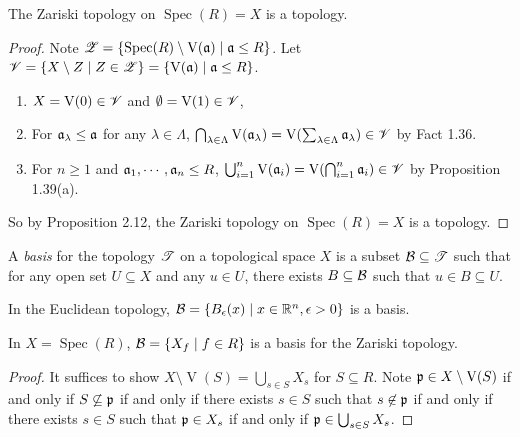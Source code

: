\begin{theorem}
    The Zariski topology on $\operatorname{Spec}(R) = X$ is a topology.
\end{theorem}

\begin{proof}
    Note $\mathscr{Z} = \{\operatorname{Spec}(R) \setminus \operatorname{V}(\mathfrak{a}) \mid \mathfrak{a} \leq R\}$. Let $\mathscr{V} = \{X \setminus Z \mid Z \in \mathscr{Z}\} = \{\operatorname{V}(\mathfrak{a}) \mid \mathfrak{a} \leq R\}$. 
    \begin{enumerate}
        \item $X = \operatorname{V}(0) \in \mathscr{V}$ and $\emptyset = \operatorname{V}(1) \in \mathscr{V}$,
        \item For $\mathfrak{a}_\lambda \leq \mathfrak{a}$ for any $\lambda \in \Lambda$, $\bigcap_{\lambda \in \Lambda} \operatorname{V}(\mathfrak{a}_\lambda) = \operatorname{V}(\sum_{\lambda \in \Lambda} \mathfrak{a}_\lambda) \in \mathscr{V}$ by Fact 1.36.
        \item For $n \geq 1$ and $\mathfrak{a}_1,\cdots,\mathfrak{a}_n \leq R$, $\bigcup_{i=1}^n \operatorname{V}(\mathfrak{a}_i) = \operatorname{V}(\bigcap_{i=1}^n \mathfrak{a}_i) \in \mathscr{V}$ by Proposition 1.39(a). \qedhere
    \end{enumerate}
    So by Proposition 2.12, the Zariski topology on $\operatorname{Spec}(R) = X$ is a topology.
\end{proof}

\begin{definition}
    A \emph{basis} for the topology $\mathscr{T}$ on a topological space $X$ is a subset $\mathcal{B} \subseteq \mathscr{T}$ such that for any open set $U \subseteq X$ and any $u \in U$, there exists $B \subseteq \mathcal{B}$ such that $u \in B \subseteq U$.
\end{definition}

\begin{example}
    In the Euclidean topology, $\mathcal{B} = \{B_\epsilon(x) \mid x \in \mathbb{R}^n, \epsilon > 0\}$ is a basis.
\end{example}

\begin{theorem}
    In $X = \operatorname{Spec}(R)$, $\mathcal{B} = \{X_f \mid f \in R\}$ is a basis for the Zariski topology.
\end{theorem}

\begin{proof}
    It suffices to show $X \setminus \operatorname{V}(S) = \bigcup_{s \in S}X_s$ for $S \subseteq R$. Note $\mathfrak{p} \in X \setminus \operatorname{V}(S)$ if and only if $S \not \subseteq \mathfrak{p}$ if and only if there exists $s \in S$ such that $s \not \in \mathfrak{p}$ if and only if there exists $s \in S$ such that $\mathfrak{p} \in X_s$ if and only if $\mathfrak{p} \in \bigcup_{s \in S}X_s$.
\end{proof}


